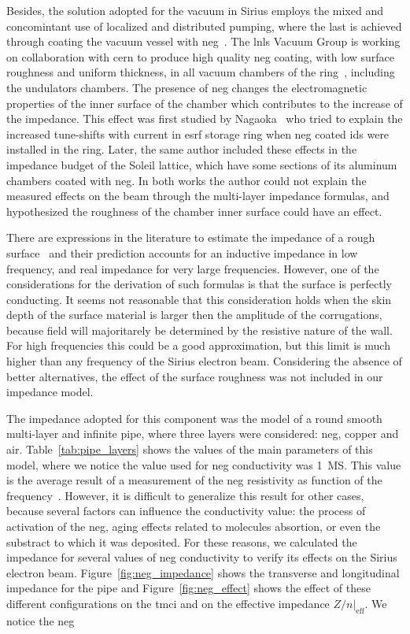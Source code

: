     Besides, the solution adopted for the vacuum in Sirius employs the mixed and concomintant use of localized and distributed pumping, where the last is achieved through coating the vacuum vessel with \gls{neg}~\cite{NEGrefs}. The \gls{lnls} Vacuum Group is working on collaboration with \gls{cern} to produce high quality \gls{neg} coating, with low surface roughness and uniform thickness, in all vacuum chambers of the ring~\cite{LNLSNEG}, including the undulators chambers. The presence of \gls{neg} changes the electromagnetic properties of the inner surface of the chamber which contributes to the increase of the impedance. This effect was first studied by Nagaoka~\cite{Nagaoka} who tried to explain the increased tune-shifts with current in \gls{esrf} storage ring when \gls{neg} coated \gls{ids} were installed in the ring. Later, the same author included these effects in the impedance budget of the Soleil lattice, which have some sections of its aluminum chambers coated with \gls{neg}. In both works the author could not explain the measured effects on the beam through the multi-layer impedance formulas, and hypothesized the roughness of the chamber inner surface could have an effect.

    There are expressions in the literature to estimate the impedance of a rough surface~\cite{Stupakov_Surface} and their prediction accounts for an inductive impedance in low frequency, and real impedance for very large frequencies. However, one of the considerations for the derivation of such formulas is that the surface is perfectly conducting. It seems not reasonable that this consideration holds when the skin depth of the surface material is larger then the amplitude of the corrugations, because field will majoritarely be determined by the resistive nature of the wall. For high frequencies this could be a good approximation, but this limit is much higher than any frequency of the Sirius electron beam. Considering the absence of better alternatives, the effect of the surface roughness was not included in our impedance model.

    The impedance adopted for this component was the model of a round smooth multi-layer and infinite pipe, where three layers were considered: \gls{neg}, copper and air. Table~\ref{tab:pipe_layers} shows the values of the main parameters of this model, where we notice the value used for \gls{neg} conductivity was \SI{1}{\mega\siemens}. This value is the average result of a measurement of the \gls{neg} resistivity as function of the frequency~\cite{NEG_measure}. However, it is difficult to generalize this result for other cases, because several factors can influence the conductivity value: the process of activation of the \gls{neg}, aging effects related to molecules absortion, or even the substract to which it was deposited. For these reasons, we calculated the impedance for several values of \gls{neg} conductivity to verify its effects on the Sirius electron beam. Figure~\ref{fig:neg_impedance} shows the transverse and longitudinal impedance for the pipe and Figure~\ref{fig:neg_effect} shows the effect of these different configurations on the \gls{tmci} and on the effective impedance $Z/n|_\text{eff}$. We notice the \gls{neg}

